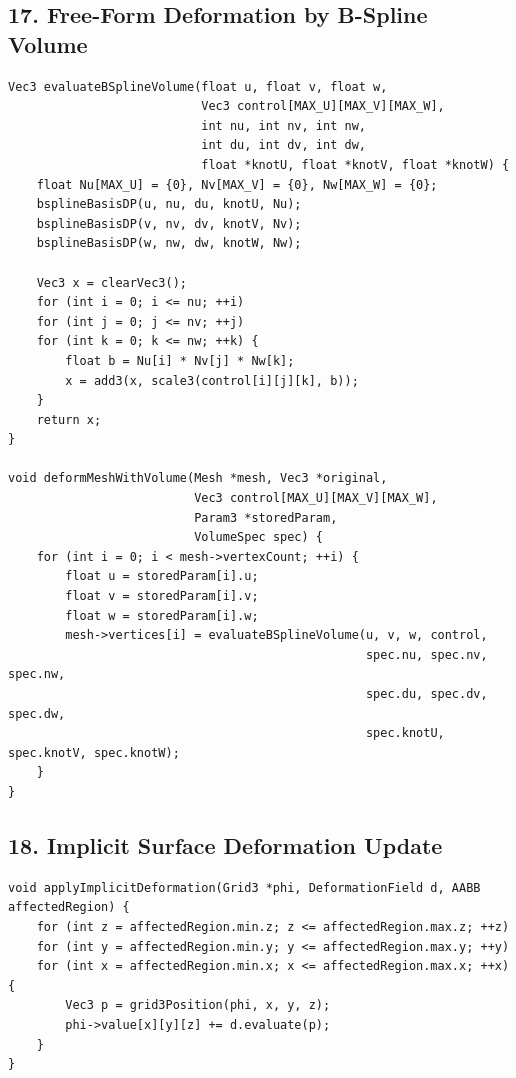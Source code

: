 \documentclass[10pt,letterpaper]{article}
\begin{document}
\subsection*{17. Free-Form Deformation by B-Spline Volume}

\begin{verbatim}
Vec3 evaluateBSplineVolume(float u, float v, float w,
                           Vec3 control[MAX_U][MAX_V][MAX_W],
                           int nu, int nv, int nw,
                           int du, int dv, int dw,
                           float *knotU, float *knotV, float *knotW) {
    float Nu[MAX_U] = {0}, Nv[MAX_V] = {0}, Nw[MAX_W] = {0};
    bsplineBasisDP(u, nu, du, knotU, Nu);
    bsplineBasisDP(v, nv, dv, knotV, Nv);
    bsplineBasisDP(w, nw, dw, knotW, Nw);

    Vec3 x = clearVec3();
    for (int i = 0; i <= nu; ++i)
    for (int j = 0; j <= nv; ++j)
    for (int k = 0; k <= nw; ++k) {
        float b = Nu[i] * Nv[j] * Nw[k];
        x = add3(x, scale3(control[i][j][k], b));
    }
    return x;
}

void deformMeshWithVolume(Mesh *mesh, Vec3 *original,
                          Vec3 control[MAX_U][MAX_V][MAX_W],
                          Param3 *storedParam,
                          VolumeSpec spec) {
    for (int i = 0; i < mesh->vertexCount; ++i) {
        float u = storedParam[i].u;
        float v = storedParam[i].v;
        float w = storedParam[i].w;
        mesh->vertices[i] = evaluateBSplineVolume(u, v, w, control,
                                                  spec.nu, spec.nv, spec.nw,
                                                  spec.du, spec.dv, spec.dw,
                                                  spec.knotU, spec.knotV, spec.knotW);
    }
}
\end{verbatim}

\subsection*{18. Implicit Surface Deformation Update}

\begin{verbatim}
void applyImplicitDeformation(Grid3 *phi, DeformationField d, AABB affectedRegion) {
    for (int z = affectedRegion.min.z; z <= affectedRegion.max.z; ++z)
    for (int y = affectedRegion.min.y; y <= affectedRegion.max.y; ++y)
    for (int x = affectedRegion.min.x; x <= affectedRegion.max.x; ++x) {
        Vec3 p = grid3Position(phi, x, y, z);
        phi->value[x][y][z] += d.evaluate(p);
    }
}
\end{verbatim}
\end{document}
